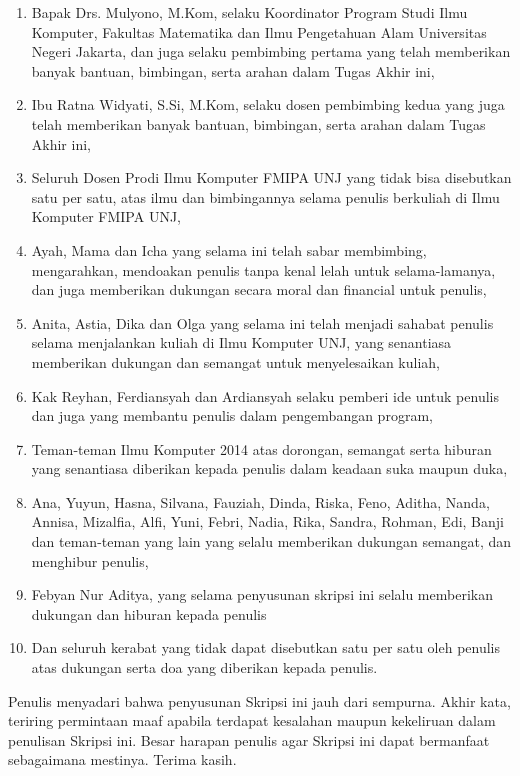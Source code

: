 \documentclass{jtetiskripsi}
\begin{document}
\begin{enumerate}
	\item{Bapak Drs. Mulyono, M.Kom, selaku Koordinator Program Studi Ilmu Komputer, Fakultas Matematika dan Ilmu Pengetahuan Alam Universitas Negeri Jakarta, dan juga selaku pembimbing pertama yang telah memberikan banyak bantuan, bimbingan, serta arahan dalam Tugas Akhir ini,}
	\item{Ibu Ratna Widyati, S.Si, M.Kom, selaku dosen pembimbing kedua yang juga telah memberikan banyak bantuan, bimbingan, serta arahan dalam Tugas Akhir ini,}
	\item{Seluruh Dosen Prodi Ilmu Komputer FMIPA UNJ yang tidak bisa disebutkan satu per satu, atas ilmu dan bimbingannya selama penulis berkuliah di Ilmu Komputer FMIPA UNJ,}
	\item{Ayah, Mama dan Icha yang selama ini telah sabar membimbing, mengarahkan, mendoakan penulis tanpa kenal lelah untuk selama-lamanya, dan juga memberikan dukungan secara moral dan financial untuk penulis,}
	\item{Anita, Astia, Dika dan Olga yang selama ini telah menjadi sahabat penulis selama menjalankan kuliah di Ilmu Komputer UNJ, yang senantiasa memberikan dukungan dan semangat untuk menyelesaikan kuliah,}
	\item{Kak Reyhan, Ferdiansyah dan Ardiansyah selaku pemberi ide untuk penulis dan juga yang membantu penulis dalam pengembangan program,}
	\item{Teman-teman Ilmu Komputer 2014 atas dorongan, semangat serta hiburan yang senantiasa diberikan kepada penulis dalam keadaan suka maupun duka,}
	\item{Ana, Yuyun, Hasna, Silvana, Fauziah, Dinda, Riska, Feno, Aditha, Nanda, Annisa, Mizalfia, Alfi, Yuni, Febri, Nadia, Rika, Sandra, Rohman, Edi, Banji dan teman-teman yang lain yang selalu memberikan dukungan semangat, dan menghibur penulis,}
	\item{Febyan Nur Aditya, yang selama penyusunan skripsi ini selalu memberikan dukungan dan hiburan kepada penulis}
	\item{Dan seluruh kerabat yang tidak dapat disebutkan satu per satu oleh penulis atas dukungan serta doa yang diberikan kepada penulis.}
\end{enumerate}

Penulis menyadari bahwa penyusunan Skripsi ini jauh dari sempurna. Akhir kata, teriring permintaan maaf apabila terdapat kesalahan maupun kekeliruan dalam penulisan Skripsi ini. Besar harapan penulis agar Skripsi ini dapat bermanfaat sebagaimana mestinya. Terima kasih.
\end{document}
